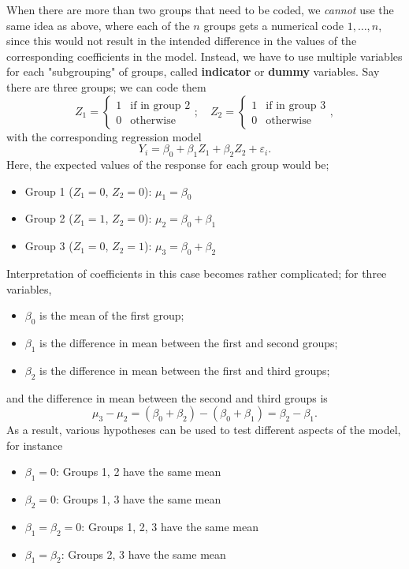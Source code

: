 \documentclass[12pt]{article}
\begin{document}
When there are more than two groups that need to be coded, we \textit{cannot} use the same idea as above, where each of the $n$ groups gets a numerical code $1,\dots, n$, since this would not result in the intended difference in the values of the corresponding coefficients in the model. Instead, we have to use multiple variables for each "subgrouping" of groups, called \textbf{indicator} or \textbf{dummy} variables. Say there are three groups; we can code them \[Z_1 =\begin{cases}
    1 & \text{if in group 2}\\
    0 & \text{otherwise}
\end{cases}; \quad Z_2 = \begin{cases}
    1 & \text{if in group 3}\\
    0 & \text{otherwise}
\end{cases},\] with the corresponding regression model \[Y_i = \beta_0 + \beta_1 Z_1 + \beta_2 Z_2 + \varepsilon_i.\] Here, the expected values of the response for each group would be; \begin{itemize}
    \item Group 1 ($Z_1 = 0$, $Z_2 = 0$): $\mu_1 = \beta_0$
    \item Group 2 ($Z_1 = 1$, $Z_2 = 0$): $\mu_2 = \beta_0 + \beta_1$
    \item Group 3 ($Z_1 = 0$, $Z_2 = 1$): $\mu_3 = \beta_0 + \beta_2$
\end{itemize}

Interpretation of coefficients in this case becomes rather complicated; for three variables, \begin{itemize}
    \item $\beta_0$ is the mean of the first group;
    \item $\beta_1$ is the difference in mean between the first and second groups;
    \item $\beta_2$ is the difference in mean between the first and third groups;
\end{itemize}

and the difference in mean between the second and third groups is \[\mu_3 - \mu_2 = (\beta_0 + \beta_2) - (\beta_0 + \beta_1) = \beta_2 - \beta_1.\] As a result, various hypotheses can be used to test different aspects of the model, for instance \begin{itemize}
    \item $\beta_1 = 0$: Groups 1, 2 have the same mean
    \item $\beta_2 = 0$: Groups 1, 3 have the same mean
    \item $\beta_1 = \beta_2 = 0$: Groups 1, 2, 3 have the same mean
    \item $\beta_1 = \beta_2$: Groups 2, 3 have the same mean
\end{itemize}
\end{document}
